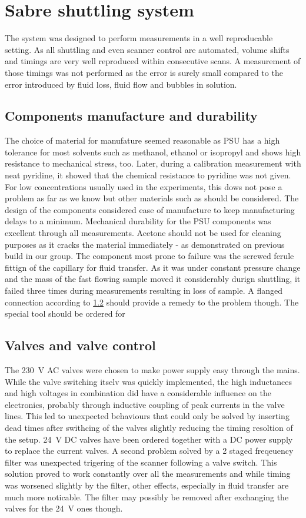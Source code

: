     \section{Sabre shuttling system}
        The system was designed to perform measurements in a well reproducable setting. As all shuttling and even scanner control are automated, volume shifts and timings are very well reproduced within consecutive scans. A measurement of those timings was not performed as the error is surely small compared to the error introduced by fluid loss, fluid flow and bubbles in solution.
        \subsection{Components manufacture and durability}
            The choice of material for manufature seemed reasonable as PSU has a high tolerance for most solvents such as methanol, ethanol or isopropyl and shows high resistance to mechanical stress, too. Later, during a calibration measurement with neat pyridine, it showed that the chemical resistance to pyridine was not given. For low concentrations usually used in the experiments, this dows not pose a problem as far as we know but other materials such as  should be considered. The design of the components considered ease of manufacture to keep manufacturing delays to a minimum.
            Mechanical durability for the PSU components was excellent through all measurements. Acetone should not be used for cleaning purposes as it cracks the material immediately - as demonstrated on previous build in our group. The component most prone to failure was the screwed ferule fittign of the capillary for fluid transfer. As it was under constant pressure change and the mass of the fast flowing sample moved it considerably durign shuttling, it failed three times during measurements resulting in loss of sample. A flanged connection according to \ref{} should provide a remedy to the problem though. The special tool should be ordered for 
        \subsection{Valves and valve control}
        The \SI{230}{\volt} AC valves were chosen to make power supply easy through the mains. While the valve switching itselv was quickly implemented, the high inductances and high voltages in combination did have a considerable influence on the electronics, probably through inductive coupling of peak currents in the valve lines. This led to unexpected behaviours that could only be solved by inserting dead times after swithcing of the valves slightly reducing the timing resoltion of the setup. \SI{24}{\volt} DC valves have been ordered together with a DC power supply to replace the current valves. A second problem solved by a 2 staged freqeuency filter was unexpected trigering of the scanner following a valve switch. This solution proved to work constantly over all the measurements and while timing was worsened slightly by the filter, other effects, especially in fluid transfer are much more noticable. The filter may possibly be removed after exchanging the valves for the \SI{24}{\volt} ones though.
